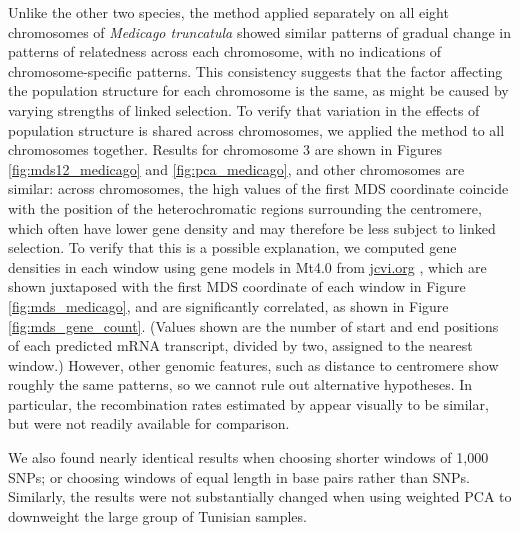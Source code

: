 \documentclass[11pt, oneside]{article}   	%
\begin{document}
Unlike the other two species,
the method applied separately on all eight chromosomes of \textit{Medicago truncatula} 
showed similar patterns of gradual change in patterns of relatedness across each chromosome,
with no indications of chromosome-specific patterns.
This consistency suggests that the factor affecting the population structure for each chromosome is the same,
as might be caused by varying strengths of linked selection.
To verify that variation in the effects of population structure is shared across chromosomes,
we applied the method to all chromosomes together.
Results for chromosome 3 are shown in Figures \ref{fig:mds12_medicago} and \ref{fig:pca_medicago},
and other chromosomes are similar:
across chromosomes, the high values of the first MDS coordinate coincide with the position of the heterochromatic regions surrounding the centromere,
which often have lower gene density and may therefore be less subject to linked selection.
To verify that this is a possible explanation,
we computed gene densities in each window using gene models in Mt4.0 from \url{jcvi.org} \citep{tang2014improved},
which are shown juxtaposed with
the first MDS coordinate of each window in Figure \ref{fig:mds_medicago},
and are significantly correlated, as shown in Figure \ref{fig:mds_gene_count}.
(Values shown are the number of start and end positions of each predicted mRNA transcript,
divided by two, assigned to the nearest window.)
However, other genomic features, such as distance to centromere show roughly the same patterns,
so we cannot rule out alternative hypotheses.
In particular, the recombination rates estimated by \citet{paape2012finescale} appear visually to be similar,
but were not readily available for comparison.

We also found nearly identical results when choosing shorter windows of 1,000 SNPs;
or choosing windows of equal length in base pairs rather than SNPs.
Similarly, the results were not substantially changed
when using weighted PCA to downweight the large group of Tunisian samples.
\end{document}
